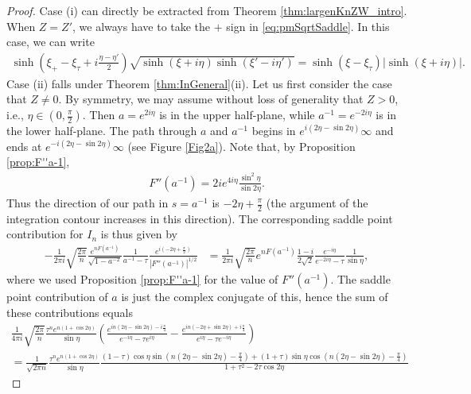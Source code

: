 \documentclass[%
 jmp,
cp,  %
 amsmath,amsthm,amssymb,%
 reprint,%
onecolumn]{revtex4-2}
\begin{document}
\begin{proof}
Case (i) can directly be extracted from Theorem \ref{thm:largenKnZW_intro}. When $Z=Z'$, we always have to take the $+$ sign in \eqref{eq:pmSqrtSaddle}. In this case, we can write
\begin{align*}
\sinh\left(\xi_+-\xi_\tau + i \frac{\eta-\eta'}{2}\right)\sqrt{\sinh(\xi+i\eta) \sinh(\xi'-i\eta')}
= \sinh(\xi-\xi_\tau) \lvert \sinh(\xi+i\eta)\rvert.
\end{align*}
Case (ii) falls under Theorem \ref{thm:InGeneral}(ii). 
Let us first consider the case that $Z\neq 0$. By symmetry, we may assume without loss of generality that $Z>0$, i.e., $\eta\in (0,\frac{\pi}{2})$. Then $a = e^{2i\eta}$ is in the upper half-plane, while $a^{-1}=e^{-2i\eta}$ is in the lower half-plane. 
The path through $a$ and $a^{-1}$ begins in $e^{i(2\eta-\sin 2\eta)} \infty$ and ends at $e^{-i(2\eta-\sin 2\eta)}\infty$ (see Figure \ref{Fig2a}). 
Note that, by Proposition \ref{prop:F''a-1}, 
\begin{align*}
F''(a^{-1}) = 2 i e^{4i\eta} \frac{\sin^2 \eta}{\sin 2\eta}.
\end{align*}
Thus the direction of our path in $s=a^{-1}$ is $-2\eta+\frac{\pi}{2}$ (the argument of the integration contour increases in this direction). The corresponding saddle point contribution for $I_n$ is thus given by
\begin{align*}
-\frac{1}{2\pi i} \sqrt{\frac{2\pi}{n}} \frac{e^{n F(a^{-1})}}{\sqrt{1-a^{-2}}} \frac{1}{a^{-1}-\tau} \frac{e^{i(-2\eta+\frac{\pi}{2})}}{|F''(a^{-1})|^{1/2}}
&= \frac{1}{2\pi i} \sqrt{\frac{2\pi}{n}} e^{n F(a^{-1})} \frac{1-i}{2\sqrt 2} \frac{e^{-i\eta}}{e^{-2i\eta}-\tau} \frac{1}{\sin \eta},
\end{align*}
where we used Proposition \ref{prop:F''a-1} for the value of $F''(a^{-1})$. 
The saddle point contribution of $a$ is just the complex conjugate of this, hence the sum of these contributions equals
\begin{multline*}
\frac{1}{4\pi i} \sqrt{\frac{2\pi}{n}} \frac{\tau^n e^{n (1+\cos 2\eta)}}{\sin \eta} 
\left(\frac{e^{i n (2\eta - \sin 2\eta) - i \frac{\pi}{4}}}{e^{-i\eta} - \tau e^{i\eta}}-
\frac{e^{i n (-2\eta + \sin 2\eta) + i \frac{\pi}{4}}}{e^{i\eta} - \tau e^{-i\eta}}\right)\\
= \frac{1}{\sqrt{2\pi n}} \frac{\tau^n e^{n (1+\cos 2\eta)}}{\sin \eta} 
\frac{(1-\tau) \cos \eta \sin\left(n(2\eta-\sin 2\eta) - \frac{\pi}{4}\right) + (1+\tau) \sin \eta \cos\left(n(2\eta-\sin 2\eta) - \frac{\pi}{4}\right)}{1+\tau^2-2\tau\cos 2\eta}

\end{multline*}
\end{proof}
\end{document}
